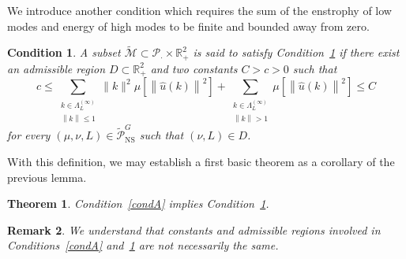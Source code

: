 \documentclass[11pt]{preprint}
\newtheorem{theorem}{Theorem}[section]
\newtheorem{condition}{Condition}
\newtheorem{remark}[theorem]{Remark}
\begin{document}
We introduce another condition which requires  the sum of the enstrophy of low modes and energy of high modes to be finite and bounded away from zero. 

\begin{condition}
\label{condB} A subset $\tilde{\mathcal{M}}\subset\mathcal{P}_{\cdot}%
\times\mathbb{R}_{+}^{2}$ is said to satisfy Condition~\ref{condB} if there
exist an admissible region $D\subset\mathbb{R}_{+}^{2}$ and two constants
$C>c>0$ such that
\[
c\leq\sum_{\substack{k\in\Lambda_{L}^{\left(  \infty\right)  }\\\left\|
k\right\|  \leq 1}}\|k\|^2\mu\left[  \left\|  \widehat
{u}\left(  k\right)  \right\|  ^{2}\right]  +\sum_{\substack{k\in\Lambda
_{L}^{\left(  \infty\right)  }\\\left\|  k\right\|  >1}}\mu\left[  \left\|
\widehat{u}\left(  k\right)  \right\|  ^{2}\right]  \leq C
\]
for every $(\mu,\nu,L)\in\tilde{\mathcal{P}}_{{\mathrm{NS}}}^{G}$ such that
$(\nu,L)\in D$. 
\end{condition}


With this definition, we may establish a first basic theorem as a corollary of
the previous lemma.

\begin{theorem} 
Condition~\ref{condA}
implies Condition~\ref{condB}.
\end{theorem}

\begin{remark}
We understand that constants and admissible regions involved
in Conditions~\ref{condA} and~\ref{condB} are not necessarily the same.
\end{remark}
\end{document}
